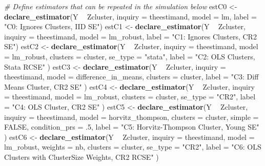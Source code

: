 \documentclass[
  12pt,
]{book}
\newenvironment{Shaded}{\begin{snugshade}}{\end{snugshade}}
\newcommand{\CommentTok}[1]{\textcolor[rgb]{0.56,0.35,0.01}{\textit{#1}}}
\newcommand{\DataTypeTok}[1]{\textcolor[rgb]{0.13,0.29,0.53}{#1}}
\newcommand{\FloatTok}[1]{\textcolor[rgb]{0.00,0.00,0.81}{#1}}
\newcommand{\KeywordTok}[1]{\textcolor[rgb]{0.13,0.29,0.53}{\textbf{#1}}}
\newcommand{\NormalTok}[1]{#1}
\newcommand{\OperatorTok}[1]{\textcolor[rgb]{0.81,0.36,0.00}{\textbf{#1}}}
\newcommand{\OtherTok}[1]{\textcolor[rgb]{0.56,0.35,0.01}{#1}}
\newcommand{\StringTok}[1]{\textcolor[rgb]{0.31,0.60,0.02}{#1}}
\theoremstyle{definition}
\theoremstyle{definition}
\theoremstyle{definition}
\theoremstyle{remark}
\begin{document}
\begin{Shaded}
\begin{Highlighting}[]
\CommentTok{# Define estimators that can be repeated in the simulation below}
\NormalTok{estC0 <-}\StringTok{ }\KeywordTok{declare_estimator}\NormalTok{(Y }\OperatorTok{~}\StringTok{ }\NormalTok{Zcluster, }\DataTypeTok{inquiry =}\NormalTok{ theestimand, }\DataTypeTok{model =}\NormalTok{ lm, }\DataTypeTok{label =} \StringTok{"C0: Ignores Clusters, IID SE"}\NormalTok{)}
\NormalTok{estC1 <-}\StringTok{ }\KeywordTok{declare_estimator}\NormalTok{(Y }\OperatorTok{~}\StringTok{ }\NormalTok{Zcluster, }\DataTypeTok{inquiry =}\NormalTok{ theestimand, }\DataTypeTok{model =}\NormalTok{ lm_robust, }\DataTypeTok{label =} \StringTok{"C1: Ignores Clusters, CR2 SE"}\NormalTok{)}
\NormalTok{estC2 <-}\StringTok{ }\KeywordTok{declare_estimator}\NormalTok{(Y }\OperatorTok{~}\StringTok{ }\NormalTok{Zcluster,}
  \DataTypeTok{inquiry =}\NormalTok{ theestimand, }\DataTypeTok{model =}\NormalTok{ lm_robust,}
  \DataTypeTok{clusters =}\NormalTok{ cluster, }\DataTypeTok{se_type =} \StringTok{"stata"}\NormalTok{, }\DataTypeTok{label =} \StringTok{"C2: OLS Clusters, Stata RCSE"}
\NormalTok{)}
\NormalTok{estC3 <-}\StringTok{ }\KeywordTok{declare_estimator}\NormalTok{(Y }\OperatorTok{~}\StringTok{ }\NormalTok{Zcluster,}
  \DataTypeTok{inquiry =}\NormalTok{ theestimand, }\DataTypeTok{model =}\NormalTok{ difference_in_means,}
  \DataTypeTok{clusters =}\NormalTok{ cluster, }\DataTypeTok{label =} \StringTok{"C3: Diff Means Cluster, CR2 SE"}
\NormalTok{)}
\NormalTok{estC4 <-}\StringTok{ }\KeywordTok{declare_estimator}\NormalTok{(Y }\OperatorTok{~}\StringTok{ }\NormalTok{Zcluster,}
  \DataTypeTok{inquiry =}\NormalTok{ theestimand, }\DataTypeTok{model =}\NormalTok{ lm_robust,}
  \DataTypeTok{clusters =}\NormalTok{ cluster, }\DataTypeTok{se_type =} \StringTok{"CR2"}\NormalTok{, }\DataTypeTok{label =} \StringTok{"C4: OLS Cluster, CR2 SE"}
\NormalTok{)}
\NormalTok{estC5 <-}\StringTok{ }\KeywordTok{declare_estimator}\NormalTok{(Y }\OperatorTok{~}\StringTok{ }\NormalTok{Zcluster,}
  \DataTypeTok{inquiry =}\NormalTok{ theestimand, }\DataTypeTok{model =}\NormalTok{ horvitz_thompson,}
  \DataTypeTok{clusters =}\NormalTok{ cluster, }\DataTypeTok{simple =} \OtherTok{FALSE}\NormalTok{, }\DataTypeTok{condition_prs =} \FloatTok{.5}\NormalTok{, }\DataTypeTok{label =} \StringTok{"C5: Horvitz-Thompson Cluster, Young SE"}
\NormalTok{)}
\NormalTok{estC6 <-}\StringTok{ }\KeywordTok{declare_estimator}\NormalTok{(Y }\OperatorTok{~}\StringTok{ }\NormalTok{Zcluster,}
  \DataTypeTok{inquiry =}\NormalTok{ theestimand, }\DataTypeTok{model =}\NormalTok{ lm_robust, }\DataTypeTok{weights =}\NormalTok{ nb,}
  \DataTypeTok{clusters =}\NormalTok{ cluster, }\DataTypeTok{se_type =} \StringTok{"CR2"}\NormalTok{, }\DataTypeTok{label =} \StringTok{"C6: OLS Clusters with ClusterSize Weights, CR2 RCSE"}
\NormalTok{)}


\end{Highlighting}
\end{Shaded}
\end{document}
